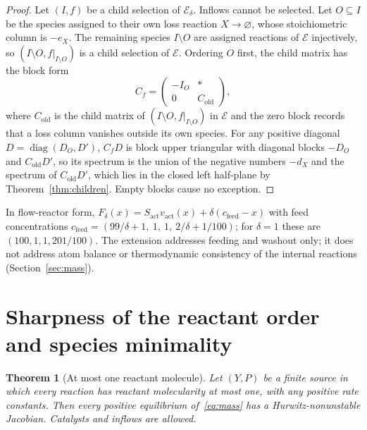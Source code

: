 \documentclass[11pt,a4paper]{article}
\theoremstyle{plain}
\newtheorem{theorem}{Theorem}[section]
\theoremstyle{definition}
\theoremstyle{remark}
\newcommand{\diag}{\operatorname{diag}}
\begin{document}
\begin{proof}
Let $(I,f)$ be a child selection of $\mathcal E_\delta$. Inflows cannot be selected. Let $O\subseteq I$ be the species assigned to their own loss reaction $X\to\varnothing$, whose stoichiometric column is $-e_X$. The remaining species $I\setminus O$ are assigned reactions of $\mathcal E$ injectively, so $(I\setminus O,f|_{I\setminus O})$ is a child selection of $\mathcal E$. Ordering $O$ first, the child matrix has the block form
\[
C_f=\begin{pmatrix}-I_O&*\\0&C_{\mathrm{old}}\end{pmatrix},
\]
where $C_{\mathrm{old}}$ is the child matrix of $(I\setminus O,f|_{I\setminus O})$ in $\mathcal E$ and the zero block records that a loss column vanishes outside its own species. For any positive diagonal $D=\diag(D_O,D')$, $C_fD$ is block upper triangular with diagonal blocks $-D_O$ and $C_{\mathrm{old}}D'$, so its spectrum is the union of the negative numbers $-d_X$ and the spectrum of $C_{\mathrm{old}}D'$, which lies in the closed left half-plane by Theorem~\ref{thm:children}. Empty blocks cause no exception.
\end{proof}

In flow-reactor form, $F_\delta(x)=S_{\mathrm{act}}v_{\mathrm{act}}(x)+\delta(c_{\mathrm{feed}}-x)$ with feed concentrations $c_{\mathrm{feed}}=(99/\delta+1,\ 1,\ 1,\ 2/\delta+1/100)$; for $\delta=1$ these are $(100,1,1,201/100)$. The extension addresses feeding and washout only; it does not address atom balance or thermodynamic consistency of the internal reactions (Section~\ref{sec:mass}).

\section{Sharpness of the reactant order and species minimality}\label{sec:sharp}

\begin{theorem}[At most one reactant molecule]\label{thm:R1}
Let $(Y,P)$ be a finite source in which every reaction has reactant molecularity at most one, with any positive rate constants. Then every positive equilibrium of~\eqref{eq:mass} has a Hurwitz-nonunstable Jacobian. Catalysts and inflows are allowed.
\end{theorem}
\end{document}
